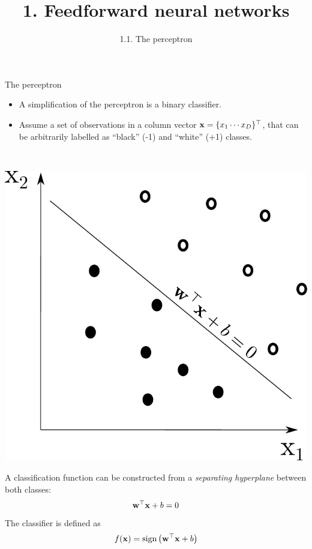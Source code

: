 \documentclass{beamer}
\title{1. Feedforward neural networks }
\subtitle{1.1. The perceptron}
\begin{document}
\maketitle



\begin{frame}{The perceptron}
\begin{itemize}
    \item A simplification of the perceptron is a  binary classifier. 
    \item Assume a set of observations  in a column vector ${\bf x} = \{x_1 \cdots x_D\}^\top$, that can be arbitrarily labelled as ``black'' (-1) and ``white'' (+1) classes.
\end{itemize}



\begin{multicols}{2}

~~\\

\begin{center}
\includegraphics[scale=0.3]{Module 1 (NN)/pics/LinearClassifier].pdf}
\end{center}
\columnbreak

A classification function can be constructed from a \emph{separating hyperplane} between both classes:
\begin{equation}
{\bf w}^\top {\bf x} + b = 0
\end{equation}
The classifier is defined as 
\begin{equation}
    f({\bf x}) = \text{sign}\left( {\bf w}^\top {\bf x} + b  \right)
\end{equation}

\end{multicols}
\end{frame}
\end{document}
